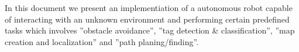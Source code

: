 In this document we present an implementiation of a autonomous robot capable of interacting with an unknown environment and performing certain predefined tasks which involves ''obstacle avoidance'', ''tag detection \& classification'', ''map creation and localization'' and ''path planing/finding''.